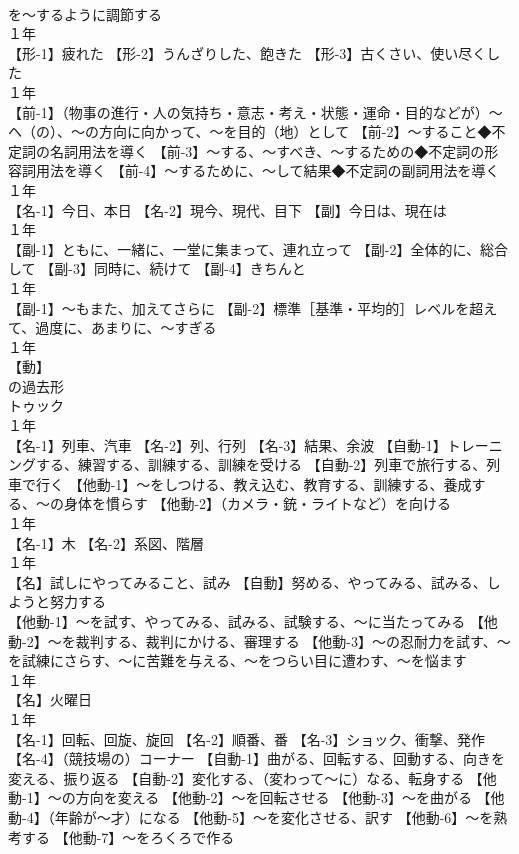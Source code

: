 \documentclass[8pt]{extreport}
\begin{document}
\begin{CJK}{UTF8}{min}
\\	を～するように調節する
\\	１年	
\\	【形-1】疲れた 【形-2】うんざりした、飽きた 【形-3】古くさい、使い尽くした
\\	１年	
\\	【前-1】（物事の進行・人の気持ち・意志・考え・状態・運命・目的などが）～ヘ（の）、～の方向に向かって、～を目的（地）として 【前-2】～すること◆不定詞の名詞用法を導く 【前-3】～する、～すべき、～するための◆不定詞の形容詞用法を導く 【前-4】～するために、～して結果◆不定詞の副詞用法を導く
\\	１年	
\\	【名-1】今日、本日 【名-2】現今、現代、目下 【副】今日は、現在は
\\	１年	
\\	【副-1】ともに、一緒に、一堂に集まって、連れ立って 【副-2】全体的に、総合して 【副-3】同時に、続けて 【副-4】きちんと
\\	１年	
\\	【副-1】～もまた、加えてさらに 【副-2】標準［基準・平均的］レベルを超えて、過度に、あまりに、～すぎる
\\	１年	
\\	【動】
\\	の過去形 
\\	トゥック
\\	１年	
\\	【名-1】列車、汽車 【名-2】列、行列 【名-3】結果、余波 【自動-1】トレーニングする、練習する、訓練する、訓練を受ける 【自動-2】列車で旅行する、列車で行く 【他動-1】～をしつける、教え込む、教育する、訓練する、養成する、～の身体を慣らす 【他動-2】（カメラ・銃・ライトなど）を向ける
\\	１年	
\\	【名-1】木 【名-2】系図、階層
\\	１年	
\\	【名】試しにやってみること、試み 【自動】努める、やってみる、試みる、しようと努力する
\\	【他動-1】～を試す、やってみる、試みる、試験する、～に当たってみる 【他動-2】～を裁判する、裁判にかける、審理する 【他動-3】～の忍耐力を試す、～を試練にさらす、～に苦難を与える、～をつらい目に遭わす、～を悩ます
\\	１年	
\\	【名】火曜日
\\	１年	
\\	【名-1】回転、回旋、旋回 【名-2】順番、番 【名-3】ショック、衝撃、発作 【名-4】（競技場の）コーナー 【自動-1】曲がる、回転する、回動する、向きを変える、振り返る 【自動-2】変化する、（変わって～に）なる、転身する 【他動-1】～の方向を変える 【他動-2】～を回転させる 【他動-3】～を曲がる 【他動-4】（年齢が～才）になる 【他動-5】～を変化させる、訳す 【他動-6】～を熟考する 【他動-7】～をろくろで作る

\end{CJK}
\end{document}
